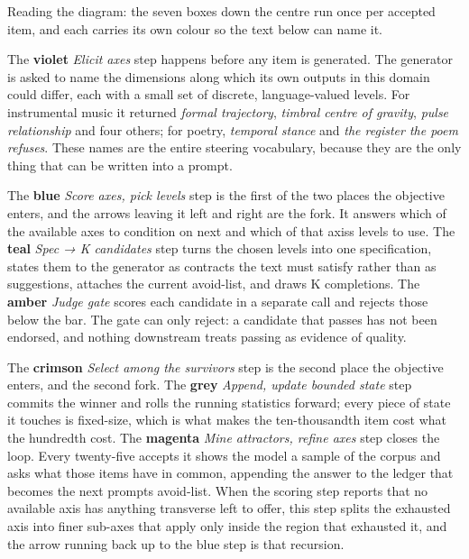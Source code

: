 \documentclass[
  11pt,
]{article}
\theoremstyle{plain}
\theoremstyle{definition}
\begin{document}
Reading the diagram: the seven boxes down the centre run once per
accepted item, and each carries its own colour so the text below can
name it.

The \textbf{violet} \emph{Elicit axes} step happens before any item is
generated. The generator is asked to name the dimensions along which its
own outputs in this domain could differ, each with a small set of
discrete, language-valued levels. For instrumental music it returned
\emph{formal trajectory}, \emph{timbral centre of gravity}, \emph{pulse
relationship} and four others; for poetry, \emph{temporal stance} and
\emph{the register the poem refuses}. These names are the entire
steering vocabulary, because they are the only thing that can be written
into a prompt.

The \textbf{blue} \emph{Score axes, pick levels} step is the first of
the two places the objective enters, and the arrows leaving it left and
right are the fork. It answers which of the available axes to condition
on next and which of that axis\textquotesingle s levels to use. The
\textbf{teal} \emph{Spec → K candidates} step turns the chosen levels
into one specification, states them to the generator as contracts the
text must satisfy rather than as suggestions, attaches the current
avoid-list, and draws K completions. The \textbf{amber} \emph{Judge
gate} scores each candidate in a separate call and rejects those below
the bar. The gate can only reject: a candidate that passes has not been
endorsed, and nothing downstream treats passing as evidence of quality.

The \textbf{crimson} \emph{Select among the survivors} step is the
second place the objective enters, and the second fork. The
\textbf{grey} \emph{Append, update bounded state} step commits the
winner and rolls the running statistics forward; every piece of state it
touches is fixed-size, which is what makes the ten-thousandth item cost
what the hundredth cost. The \textbf{magenta} \emph{Mine attractors,
refine axes} step closes the loop. Every twenty-five accepts it shows
the model a sample of the corpus and asks what those items have in
common, appending the answer to the ledger that becomes the next
prompts\textquotesingle{} avoid-list. When the scoring step reports that
no available axis has anything transverse left to offer, this step
splits the exhausted axis into finer sub-axes that apply only inside the
region that exhausted it, and the arrow running back up to the blue step
is that recursion.
\end{document}

